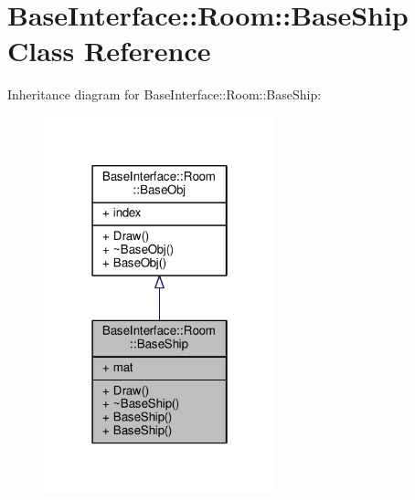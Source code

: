 \hypertarget{classBaseInterface_1_1Room_1_1BaseShip}{}\section{Base\+Interface\+:\+:Room\+:\+:Base\+Ship Class Reference}
\label{classBaseInterface_1_1Room_1_1BaseShip}


Inheritance diagram for Base\+Interface\+:\+:Room\+:\+:Base\+Ship\+:
\nopagebreak
\begin{figure}[H]
\begin{center}
\leavevmode
\includegraphics[width=190pt]{df/d27/classBaseInterface_1_1Room_1_1BaseShip__inherit__graph}
\end{center}
\end{figure}


